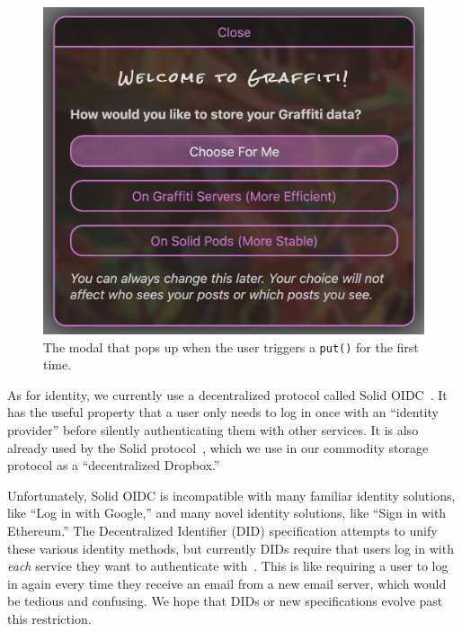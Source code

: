 \begin{figure}[h]
    \includegraphics[width=\columnwidth]{paper/figures/choose-protocol.png}
    \caption{The modal that pops up when the user triggers a \texttt{put()} for the first time.}
    \label{above-and-below:figure:choose-protocol}
\end{figure}

As for identity, we currently use a decentralized protocol called Solid OIDC~\cite{solidoidc}.
It has the useful property that a user only needs to log in once
with an ``identity provider'' before silently authenticating
them with other services.
It is also already used by the Solid protocol~\cite{solid},
which we use in our commodity storage protocol as a ``decentralized Dropbox.''

Unfortunately, Solid OIDC is incompatible with many familiar
identity solutions, like ``Log in with Google,''
and many novel identity solutions, like ``Sign in with Ethereum.''
The Decentralized Identifier (DID) specification attempts to unify
these various identity methods, but currently DIDs require that
users log in with \emph{each} service they want to authenticate with~\cite{dids}.
This is like requiring a user to log in again every time
they receive an email from a new email server, which would
be tedious and confusing.
We hope that DIDs or new specifications evolve past this restriction.

